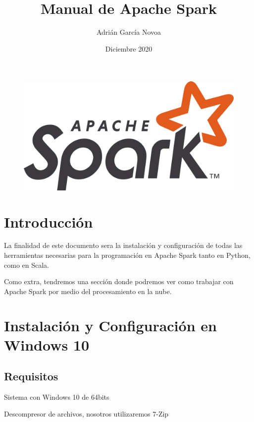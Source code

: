 \documentclass[a4paper,10pt]{article}
\title{Manual de Apache Spark}
\author{Adrián García Novoa}
\date{Diciembre 2020}
\begin{document}
\begin{figure}[H]
\begin{center}
\includegraphics[width=340pt]{./fotos/introduccion/Apache_Spark_logo.jpg}
\end{center}
\end{figure}
\clearpage

\lhead{\leftmark}
\chead{}
\renewcommand{\headrulewidth}{0.4pt}
\lfoot{}
\cfoot{\thepage}
\rfoot{}
\renewcommand{\footrulewidth}{0.4pt}

\tableofcontents
\clearpage

\lhead{\leftmark}

\section{Introducción}

La finalidad de este documento sera la instalación y configuración de todas las herramientas necesarias para la programación en Apache Spark tanto en Python, como en Scala. 

Como extra, tendremos una sección donde podremos ver como trabajar con Apache Spark por medio del procesamiento en la nube.
	
\clearpage		

\section{Instalación y Configuración en Windows 10}

\subsection{Requisitos}

Sistema con Windows 10 de 64bits

Descompresor de archivos, nosotros utilizaremos 7-Zip
\end{document}
